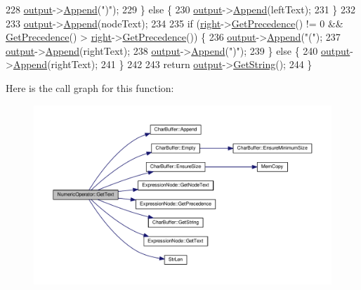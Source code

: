 \begin{DoxyCode}
228         \hyperlink{classSyntaxNode_a1180628cbe3fce43930cee0df5a9ce5c}{output}->\hyperlink{classCharBuffer_a045b38735f7b3007c1b98d3d7b7feafe}{Append}(\textcolor{stringliteral}{")"});
229     \} \textcolor{keywordflow}{else} \{
230         \hyperlink{classSyntaxNode_a1180628cbe3fce43930cee0df5a9ce5c}{output}->\hyperlink{classCharBuffer_a045b38735f7b3007c1b98d3d7b7feafe}{Append}(leftText);
231     \}
232 
233     \hyperlink{classSyntaxNode_a1180628cbe3fce43930cee0df5a9ce5c}{output}->\hyperlink{classCharBuffer_a045b38735f7b3007c1b98d3d7b7feafe}{Append}(nodeText);
234 
235     \textcolor{keywordflow}{if} (\hyperlink{classNumericOperator_aa2c5b5bea59bbb068bc6013bc5cac483}{right}->\hyperlink{classExpressionNode_a161b9ea0b79bbfc101d6f687c8481ddd}{GetPrecedence}() != 0 && \hyperlink{classExpressionNode_a161b9ea0b79bbfc101d6f687c8481ddd}{GetPrecedence}() > 
      \hyperlink{classNumericOperator_aa2c5b5bea59bbb068bc6013bc5cac483}{right}->\hyperlink{classExpressionNode_a161b9ea0b79bbfc101d6f687c8481ddd}{GetPrecedence}()) \{
236         \hyperlink{classSyntaxNode_a1180628cbe3fce43930cee0df5a9ce5c}{output}->\hyperlink{classCharBuffer_a045b38735f7b3007c1b98d3d7b7feafe}{Append}(\textcolor{stringliteral}{"("});
237         \hyperlink{classSyntaxNode_a1180628cbe3fce43930cee0df5a9ce5c}{output}->\hyperlink{classCharBuffer_a045b38735f7b3007c1b98d3d7b7feafe}{Append}(rightText);
238         \hyperlink{classSyntaxNode_a1180628cbe3fce43930cee0df5a9ce5c}{output}->\hyperlink{classCharBuffer_a045b38735f7b3007c1b98d3d7b7feafe}{Append}(\textcolor{stringliteral}{")"});
239     \} \textcolor{keywordflow}{else} \{
240         \hyperlink{classSyntaxNode_a1180628cbe3fce43930cee0df5a9ce5c}{output}->\hyperlink{classCharBuffer_a045b38735f7b3007c1b98d3d7b7feafe}{Append}(rightText);
241     \}
242 
243     \textcolor{keywordflow}{return} \hyperlink{classSyntaxNode_a1180628cbe3fce43930cee0df5a9ce5c}{output}->\hyperlink{classCharBuffer_a7dfd3feaaf80f318ba44efe15b1ec44b}{GetString}();
244 \}
\end{DoxyCode}


Here is the call graph for this function\+:
\nopagebreak
\begin{figure}[H]
\begin{center}
\leavevmode
\includegraphics[width=350pt]{dc/d84/classNumericOperator_aaeef2885eb34d240cef0f55593354805_cgraph}
\end{center}
\end{figure}


